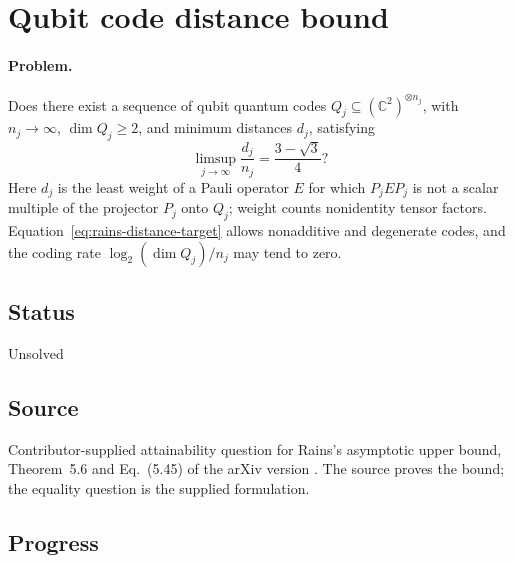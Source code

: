 \section{Qubit code distance bound}
\label{sec:op_edcb345719181830}

\paragraph{Problem.}
Does there exist a sequence of qubit quantum codes $Q_j\subseteq(\mathbb C^2)^{\otimes n_j}$, with $n_j\to\infty$, $\dim Q_j\geq2$, and minimum distances $d_j$, satisfying
\begin{equation}
  \limsup_{j\to\infty}\frac{d_j}{n_j}=\frac{3-\sqrt3}{4}?
  \label{eq:rains-distance-target}
\end{equation}
Here $d_j$ is the least weight of a Pauli operator $E$ for which $P_jEP_j$ is not a scalar multiple of the projector $P_j$ onto $Q_j$; weight counts nonidentity tensor factors. Equation~\eqref{eq:rains-distance-target} allows nonadditive and degenerate codes, and the coding rate $\log_2(\dim Q_j)/n_j$ may tend to zero.

\subsection*{Status}

Unsolved

\subsection*{Source}

Contributor-supplied attainability question for Rains's asymptotic upper bound, Theorem~5.6 and Eq.~(5.45) of the arXiv version . The source proves the bound; the equality question is the supplied formulation.

\subsection*{Progress}

